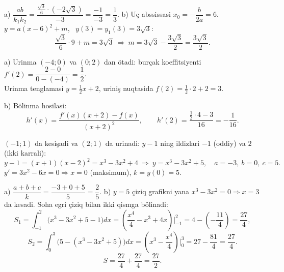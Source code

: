 a) $\dfrac{ab}{k_1k_2}=\dfrac{\frac{\sqrt3}6\cdot(-2\sqrt3)}{-3}=\dfrac{-1}{-3}=\dfrac13$.
b) Uç abssissasi $x_0=-\dfrac b{2a}=6$. \ $y=a(x-6)^2+m$, \ $y(3)=y_1(3)=3\sqrt3$:
\[\frac{\sqrt3}6\cdot9+m=3\sqrt3\ \Rightarrow\ m=3\sqrt3-\frac{3\sqrt3}2=\frac{3\sqrt3}2.\]

\newpage
{}
a) Urinma $(-4;0)$ va $(0;2)$ dan ötadi: burçak koeffitsiyenti $f'(2)=\dfrac{2-0}{0-(-4)}=\dfrac12$.\\
Urinma tenglamasi $y=\frac12x+2$, uriniş nuqtasida $f(2)=\frac12\cdot2+2=3$.

b) Bölinma hosilasi:
\[h'(x)=\frac{f'(x)(x+2)-f(x)}{(x+2)^2},\qquad h'(2)=\frac{\frac12\cdot4-3}{16}=-\frac1{16}.\]

\newpage
{}
$(-1;1)$ da kesişadi va $(2;1)$ da urinadi: $y-1$ ning ildizlari $-1$ (oddiy) va $2$ (ikki karrali):
\[y-1=(x+1)(x-2)^2=x^3-3x^2+4\ \Rightarrow\ y=x^3-3x^2+5,\quad a=-3,\ b=0,\ c=5.\]
$y'=3x^2-6x=0\Rightarrow x=0$ (maksimum), $k=y(0)=5$.

a) $\dfrac{a+b+c}k=\dfrac{-3+0+5}5=\dfrac25$.
b) $y=5$ çiziq grafikni yana $x^3-3x^2=0\Rightarrow x=3$ da kesadi. Soha egri çiziq bilan ikki qismga bölinadi:
\[S_1=\int_{-1}^{2}\bigl(x^3-3x^2+5-1\bigr)dx=\left(\frac{x^4}4-x^3+4x\right)\Big|_{-1}^{2}=4-\left(-\frac{11}4\right)=\frac{27}4,\]
\[S_2=\int_0^3\bigl(5-(x^3-3x^2+5)\bigr)dx=\left(x^3-\frac{x^4}4\right)\Big|_0^3=27-\frac{81}4=\frac{27}4.\]
\[S=\frac{27}4+\frac{27}4=\frac{27}2.\]

